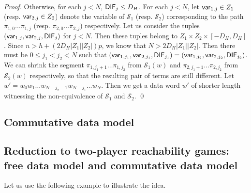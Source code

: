 \documentclass[runningheads,a4paper]{llncs}
\newcommand\Ss{\mathcal{S}}
\begin{document}
\begin{proof}
Otherwise, for each $j < N$,  ${\sf DIF}_j \le D_H$. For each $j < N$, let ${\sf var}_{1,j} \in Z_1$ (resp. ${\sf var}_{2,j} \in Z_2$) denote the variable of $\Ss_1$ (resp. $\Ss_2$) corresponding to the path $\pi_{1,0} \dots \pi_{1,j}$ (resp. $\pi_{2,0} \dots \pi_{2,j}$) respectively. Let us consider the tuples $({\sf var}_{1,j}, {\sf var}_{2,j}, {\sf DIF}_j)$ for $j < N$. Then these tuples belong to $Z_1 \times Z_2 \times [-D_H, D_H]$. Since $n  > h+(2D_H |Z_1|  |Z_2|)p$,  we know that $N > 2D_H |Z_1|  |Z_2|$. 
Then there must be $0 \le j_1 < j_2 < N$ such that $({\sf var}_{1, j_1}, {\sf var}_{2, j_1}, {\sf DIF}_{j_1}) = ({\sf var}_{1, j_2}, {\sf var}_{2, j_2}, {\sf DIF}_{j_2})$. We can shrink the segment $\pi_{1, j_1+1} \dots \pi_{1,j_2}$ from $\Ss_1(w)$ and   $\pi_{2, j_1+1} \dots \pi_{2,j_2}$ from $\Ss_2(w)$ respectively, so that the resulting pair of terms are still different. Let $w' = w_0 w_1 \dots w_{N-j_2-1} w_{N- j_1} \dots w_N$. Then we get a data word $w'$ of shorter length witnessing the non-equivalence of $\Ss_1$ and $\Ss_2$. 
\qed
\end{proof}


\subsection{Commutative data model}


\subsection{Reduction to two-player reachability games: free data model and commutative data model}

Let us use the following example to illustrate the idea.
\end{document}
